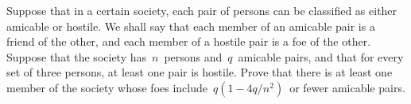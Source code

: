 Suppose that in a certain society, each pair of persons can be classified as either amicable or hostile. We shall say that each member of an amicable pair is a friend of the other, and each member of a hostile pair is a  foe of the other.  Suppose that the society has $\, n \,$ persons and $\, q \,$ amicable pairs, and that for every set of three persons, at least one pair is hostile.  Prove that there is at least one member of the society whose foes include $\, q(1 - 4q/n^2) \,$ or fewer amicable pairs.